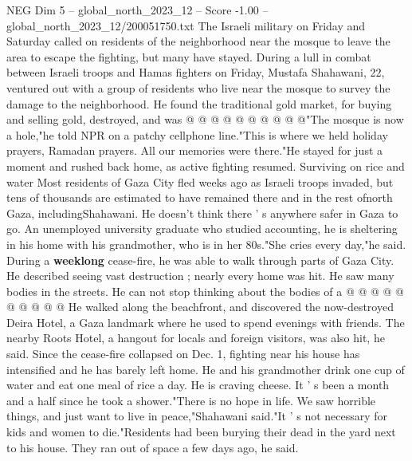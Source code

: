 \begin{textsample}{NEG Dim 5 – global\_north\_2023\_12 – Score -1.00 – global\_north\_2023\_12/200051750.txt}
The Israeli military on Friday and Saturday called on residents of the neighborhood near the mosque to leave the area to escape the fighting, but many have stayed.
During a lull in combat between Israeli troops and Hamas fighters on Friday, Mustafa Shahawani, 22, ventured out with a group of residents who live near the mosque to survey the damage to the neighborhood.
He found the traditional gold market, for buying and selling gold, destroyed, and was @ @ @ @ @ @ @ @ @ @"The mosque is now a hole,"he told NPR on a patchy cellphone line."This is where we held holiday prayers, Ramadan prayers.
All our memories were there."He stayed for just a moment and rushed back home, as active fighting resumed.
Surviving on rice and water Most residents of Gaza City fled weeks ago as Israeli troops invaded, but tens of thousands are estimated to have remained there and in the rest ofnorth Gaza, includingShahawani.
He doesn't think there ' s anywhere safer in Gaza to go.
An unemployed university graduate who studied accounting, he is sheltering in his home with his grandmother, who is in her 80s."She cries every day,"he said.
During a \textbf{weeklong} cease-fire, he was able to walk through parts of Gaza City.
He described seeing vast destruction ; nearly every home was hit.
He saw many bodies in the streets.
He can not stop thinking about the bodies of a @ @ @ @ @ @ @ @ @ @ He walked along the beachfront, and discovered the now-destroyed Deira Hotel, a Gaza landmark where he used to spend evenings with friends.
The nearby Roots Hotel, a hangout for locals and foreign visitors, was also hit, he said.
Since the cease-fire collapsed on Dec. 1, fighting near his house has intensified and he has barely left home.
He and his grandmother drink one cup of water and eat one meal of rice a day.
He is craving cheese.
It ' s been a month and a half since he took a shower."There is no hope in life.
We saw horrible things, and just want to live in peace,"Shahawani said."It ' s not necessary for kids and women to die."Residents had been burying their dead in the yard next to his house.
They ran out of space a few days ago, he said.

\end{textsample}
